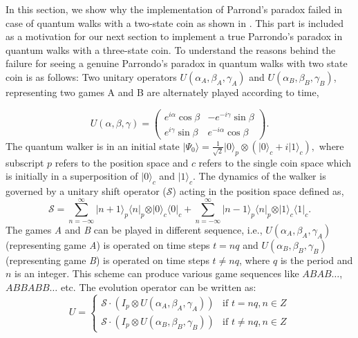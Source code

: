 \documentclass[english,aps,pra,amsmath,amssymb,showpacs,notitlepage,onecolumn]{revtex4-1}
\begin{document}
In this section, we show why the implementation of Parrond's paradox failed in case of quantum walks with a two-state coin as shown in \cite{minli,flitney}. This part is included as a motivation for our next section to implement a true Parrondo's paradox in quantum walks with a three-state coin.  To understand the reasons behind the failure for seeing a genuine Parrondo's paradox in quantum walks with two state coin is as follows: Two unitary operators $U(\alpha_{A},\beta_{A},\gamma_{A})$ and $U(\alpha_{B},\beta_{B},\gamma_{B})$, representing two games A and B are alternately played according to time,


\begin{equation}
U(\alpha,\beta,\gamma)=\left(\begin{array}{cc}
e^{i\alpha}\cos\beta & -e^{-i\gamma}\sin\beta\\
e^{i\gamma}\sin\beta & e^{-i\alpha}\cos\beta
\end{array}\right).\label{eq:SU(2)}
\end{equation}
The quantum walker is in an initial state $\vert\Psi_{0}\rangle=\frac{1}{\sqrt{2}}\vert 0\rangle_p \otimes(\vert 0\rangle_c +i\vert 1\rangle_c),$ where subscript $p$ refers to the position space and $c$ refers to the single coin space which is initially in  a superposition of $|0\rangle_c$ and $|1\rangle_c$. The dynamics of the walker is governed by a unitary shift operator ($\mathcal{S}$) acting in the position space defined as,
\begin{equation}
\mathcal{S} =   \sum\limits_{n=-\infty}^{\infty}\vert n+1 \rangle_p \langle n \vert_p \otimes \vert 0 \rangle_c \langle 0 \vert_c +   \sum\limits_{n=-\infty}^{\infty}\vert n-1 \rangle_p \langle n \vert_p \otimes \vert 1 \rangle_c \langle 1 \vert_c.
\label{Equ:S}
\end{equation}
The games \emph{A} and \emph{B} can be played in different sequence, i.e., $U(\alpha_{A},\beta_{A},\gamma_{A})$(representing game \emph{A}) is operated on time steps $t=nq$ and $U(\alpha_{B},\beta_{B},\gamma_{B})$(representing game \emph{B}) is operated on time steps $t\neq nq$, where $q$ is the period and $n$ is an integer. This scheme can produce various game sequences like $ABAB\ldots$, $ABBABB\ldots$ etc. The evolution operator can be written as: 
\begin{equation}
U =\left\lbrace 
	\begin{array}{ll}
		\mathcal{S}\cdot (I_p \otimes U(\alpha_{A},\beta_{A},\gamma_{A}))  & \mbox{if } t=nq,n\in Z \\
		\mathcal{S}\cdot (I_p \otimes U(\alpha_{B},\beta_{B},\gamma_{B})) & \mbox{if } t\neq nq,n\in Z
	\end{array}
\right. 
\end{equation}
\end{document}
